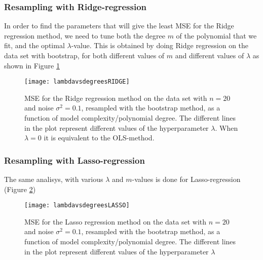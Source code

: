 \subsubsection{Resampling with Ridge-regression}
In order to find the parameters that will give the least MSE for the Ridge regression method, we need to tune both the degree $m$ of the polynomial that we fit, and the optimal $\lambda$-value. This is obtained by doing Ridge regression on the data set with bootstrap, for both different values of $m$ and different values of $\lambda$ as shown in Figure \ref{fig:lambdavsdegreesRIDGE}

\begin{figure}[htbp]
	\centering
	\texttt{[image: lambdavsdegreesRIDGE]}
	\caption{MSE for the Ridge regression method on the data set with $n=20$ and noise $\sigma^2=0.1$, resampled with the bootstrap method, as a function of model complexity/polynomial degree. The different lines in the plot represent different values of the hyperparameter $\lambda$. When $\lambda=0$ it is equivalent to the OLS-method.}
	\label{fig:lambdavsdegreesRIDGE}
\end{figure}

\subsubsection{Resampling with Lasso-regression}
The same analisys, with various $\lambda$ and $m$-values is done for Lasso-regression (Figure \ref{fig:lambdavsdegreesLASSO})
\begin{figure}[htbp]
	\centering
	\texttt{[image: lambdavsdegreesLASSO]}
	\caption{MSE for the Lasso regression method on the data set with $n=20$ and noise $\sigma^2=0.1$, resampled with the bootstrap method, as a function of model complexity/polynomial degree. The different lines in the plot represent different values of the hyperparameter $\lambda$}
	\label{fig:lambdavsdegreesLASSO}
\end{figure}


